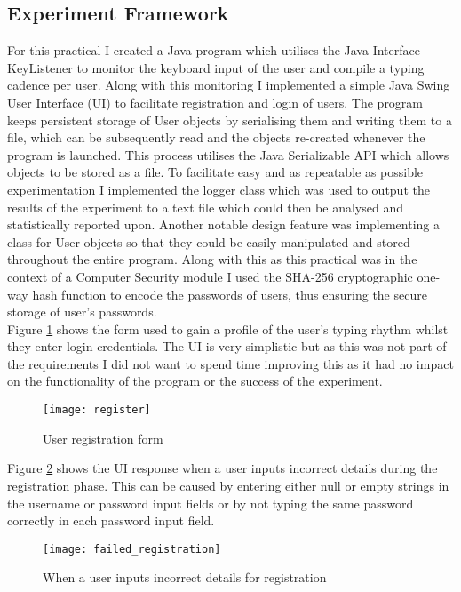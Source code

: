 \documentclass{article}
\begin{document}
\subsection{Experiment Framework} \label{setup}
For this practical I created a Java program which utilises the Java Interface KeyListener to monitor the keyboard input of the user and compile a typing cadence per user. Along with this monitoring I implemented a simple Java Swing User Interface (UI) to facilitate registration and login of users. The program keeps persistent storage of User objects by serialising them and writing them to a file, which can be subsequently read and the objects re-created whenever the program is launched. This process utilises the Java Serializable API which allows objects to be stored as a file. To facilitate easy and as repeatable as possible experimentation I implemented the logger class which was used to output the results of the experiment to a text file which could then be analysed and statistically reported upon. Another notable design feature was implementing a class for User objects so that they could be easily manipulated and stored throughout the entire program. Along with this as this practical was in the context of a Computer Security module I used the SHA-256 cryptographic one-way hash function to encode the passwords of users, thus ensuring the secure storage of user's passwords.       \\

Figure \ref{fig:register} shows the form used to gain a profile of the user's typing rhythm whilst they enter login credentials. The UI is very simplistic but as this was not part of the requirements I did not want to spend time improving this as it had no impact on the functionality of the program or the success of the experiment. 

\begin{figure}[H]
    \centering
    \texttt{[image: register]}
    \caption{User registration form}
    \label{fig:register}
\end{figure}

Figure \ref{fig:failed_registration} shows the UI response when a user inputs incorrect details during the registration phase. This can be caused by entering either null or empty strings in the username or password input fields or by not typing the same password correctly in each password input field. 

\begin{figure}[H]
    \centering
    \texttt{[image: failed\_registration]}
    \caption{When a user inputs incorrect details for registration}
    \label{fig:failed_registration}
\end{figure}
\end{document}

